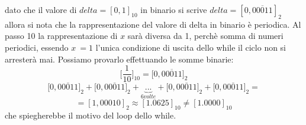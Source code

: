 \begin{flushleft}

dato che il valore di $delta=[0,1]_{10}$ in binario si scrive $delta=[0,\overline{00011}]_2$ allora si nota che la rappresentazione del valore di delta in binario è periodica. Al passo 10 la rappresentazione di $x$ sarà diversa da 1, perchè somma di numeri periodici, essendo $x~=1$ l'unica condizione di uscita dello while il ciclo non si arresterà mai. Possiamo provarlo effettuando le somme binarie:
\[
\Big[\frac{1}{10}\Big]_{10}=\Big[0,\overline{00011}\Big]_2
\]
\[
\Big[0,\overline{00011}\Big]_2+\Big[0,\overline{00011}\Big]_2+ \underbrace{...}_{6volte}+\Big[0,\overline{00011}\Big]_2+\Big[0,\overline{00011}\Big]_2 = 
\]
\[
= [1,00010]_2 \approx [1.0625]_{10} \neq [1.0000]_{10}
\]
che spiegherebbe il motivo del loop dello while.
\end{flushleft}
